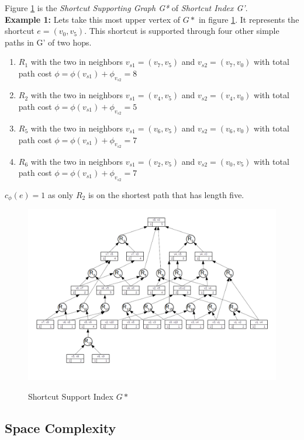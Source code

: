 \documentclass[twocolumn]{article}
\begin{document}
Figure \ref{fig:SsGraph} is the \textit{Shortcut Supporting Graph G*} of \textit{Shortcut Index G'}.
\\
\textbf{Example 1:} Lets take this most upper vertex of $G*$ in figure \ref{fig:SsGraph}. It represents
the shortcut $e= (v_0, v_5)$. This shortcut is supported through four other simple paths in G' of two hops.
\begin{enumerate}
    \item $R_1$ with the two in neighbors $v_{s1} = (v_7, v_5)$ and $v_{s2} = (v_7, v_0)$ with total path cost $\phi = \phi(v_{s1}) + \phi_{v_{s2}} = 8$
    \item $R_2$ with the two in neighbors $v_{s1} = (v_4, v_5)$ and $v_{s2} = (v_4, v_0)$ with total path cost $\phi = \phi(v_{s1}) + \phi_{v_{s2}} = 5$
    \item $R_5$ with the two in neighbors $v_{s1} = (v_6, v_5)$ and $v_{s2} = (v_6, v_0)$ with total path cost $\phi = \phi(v_{s1}) + \phi_{v_{s2}} = 7$
    \item $R_6$ with the two in neighbors $v_{s1} = (v_2, v_5)$ and $v_{s2} = (v_0, v_5)$ with total path cost $\phi = \phi(v_{s1}) + \phi_{v_{s2}} = 7$
\end{enumerate}

$c_{\phi}(e) = 1$ as only $R_2$ is on the shortest path that has length five. 

\begin{figure}[t]
    \caption{Shortcut Support Index $G*$}
    \centering
    \includegraphics[width=\textwidth]{SsGraph}
    \label{fig:SsGraph}
\end{figure}

\subsection{Space Complexity}
\end{document}
